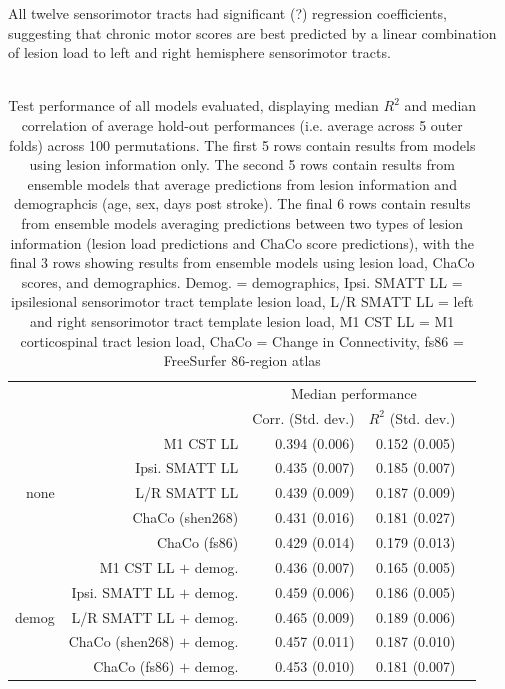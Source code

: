 \documentclass[10pt]{article}
\def\Plus{\texttt{+}}
\begin{document}
All twelve sensorimotor tracts had significant (?) regression coefficients, suggesting that chronic motor scores are best predicted by a linear combination of lesion load to left and right hemisphere sensorimotor tracts. 
\\
\\
\begin{table}[h]
\centering
\caption{Test performance of all models evaluated, displaying median $R^2$ and median correlation of average hold-out performances (i.e. average across 5 outer folds) across 100 permutations. The first 5 rows contain results from models using lesion information only. The second 5 rows contain results from ensemble models that average predictions from lesion information and demographcis (age, sex, days post stroke). The final 6 rows contain results from ensemble models averaging predictions between two types of lesion information (lesion load predictions and ChaCo score predictions), with the final 3 rows showing results from ensemble models using lesion load, ChaCo scores, and demographics. Demog. = demographics, Ipsi. SMATT LL = ipsilesional sensorimotor tract template lesion load, L/R SMATT LL = left and right sensorimotor tract template lesion load, M1 CST LL = M1 corticospinal tract lesion load, ChaCo = Change in Connectivity, fs86 = FreeSurfer 86-region atlas}
\label{table:5}
\begin{tabular}{rrrrr}
\toprule
 &  & \multicolumn{2}{c}{Median performance} \\
 &  & Corr. (Std. dev.) & $R^2$ (Std. dev.) \\
\midrule
\multirow[t]{5}{*}{none} & M1 CST LL & 0.394 (0.006) & 0.152 (0.005) \\
 & Ipsi. SMATT LL & 0.435 (0.007) & 0.185 (0.007) \\
 & L/R SMATT LL & 0.439 (0.009) & 0.187 (0.009) \\
 & ChaCo (shen268) & 0.431 (0.016) & 0.181 (0.027) \\
 & ChaCo (fs86) & 0.429 (0.014) & 0.179 (0.013) \\
\multirow[t]{5}{*}{demog} & M1 CST LL $\Plus$ demog. & 0.436 (0.007) & 0.165 (0.005) \\
 & Ipsi. SMATT LL $\Plus$ demog. & 0.459 (0.006) & 0.186 (0.005) \\
 & L/R SMATT LL $\Plus$ demog. & 0.465 (0.009) & 0.189 (0.006) \\
 & ChaCo (shen268) $\Plus$ demog. & 0.457 (0.011) & 0.187 (0.010) \\
 & ChaCo (fs86) $\Plus$ demog. & 0.453 (0.010) & 0.181 (0.007) \\

\end{tabular}
\end{table}
\end{document}
